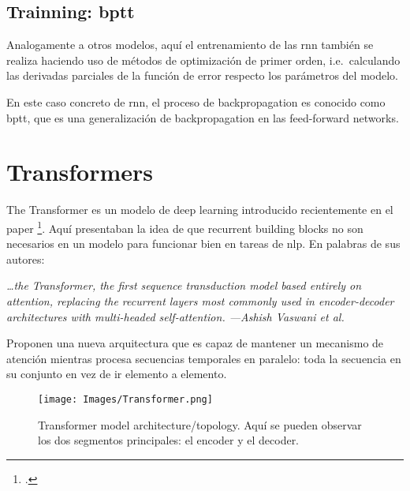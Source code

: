 \subsection{Trainning: \acl*{bptt}}

Analogamente a otros modelos, aquí el entrenamiento de las \gls{rnn} también se
realiza haciendo uso de métodos de optimización de primer orden, i.e.\
calculando las derivadas parciales de la función de error respecto los
parámetros del modelo.

En este caso concreto de \gls{rnn}, el proceso de backpropagation es conocido
como \gls{bptt}, que es una generalización de backpropagation en las
feed-forward networks.


\section{Transformers} \label{sec:transformers}

The Transformer es un modelo de deep learning introducido recientemente en el
paper \citetitle{vaswani17:atten_all_you_need}
\footcite{vaswani17:atten_all_you_need}. Aquí presentaban la idea de que
recurrent building blocks no son necesarios en un modelo para funcionar bien en
tareas de \gls{nlp}. En palabras de sus autores:

\begin{quoteBox}
  \itshape
  \ldots the Transformer, the first sequence transduction model based entirely
  on attention, replacing the recurrent layers most commonly used in
  encoder-decoder architectures with multi-headed self-attention.
  \tcblower
  \hfill \upshape
  ---Ashish Vaswani et al.
\end{quoteBox}

Proponen una nueva arquitectura que es capaz de mantener un mecanismo de
atención mientras procesa secuencias temporales en paralelo: toda la secuencia
en su conjunto en vez de ir elemento a elemento.

\begin{figure}[p]
  \centering
  \texttt{[image: Images/Transformer.png]}
  \caption[Transformer model architecture]{Transformer model
    architecture/topology. Aquí se pueden observar los dos segmentos
    principales: el encoder y el decoder.}
  \label{fig:transformer}
\end{figure}

